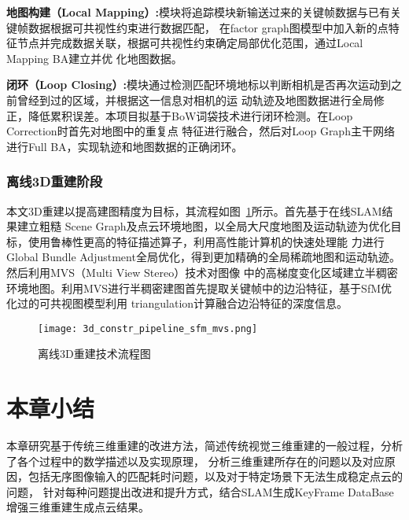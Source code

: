 \textbf{地图构建（Local Mapping）:}模块将追踪模块新输送过来的关键帧数据与已有关键帧数据根据可共视性约束进行数据匹配，
在factor graph图模型中加入新的点特征节点并完成数据关联，根据可共视性约束确定局部优化范围，通过Local Mapping BA建立并优
化地图数据。

\textbf{闭环（Loop Closing）:}模块通过检测匹配环境地标以判断相机是否再次运动到之前曾经到过的区域，并根据这一信息对相机的运
动轨迹及地图数据进行全局修正，降低累积误差。本项目拟基于BoW词袋技术进行闭环检测。在Loop Correction时首先对地图中的重复点
特征进行融合，然后对Loop Graph主干网络进行Full BA，实现轨迹和地图数据的正确闭环。
\subsubsection{离线3D重建阶段}
\label{sec:3.3.3.2}
本文3D重建以提高建图精度为目标，其流程如图~\ref{fig:3d_constr_pipeline_sfm_mvs}所示。首先基于在线SLAM结果建立粗糙
Scene Graph及点云环境地图，以全局大尺度地图及运动轨迹为优化目标，使用鲁棒性更高的特征描述算子，利用高性能计算机的快速处理能
力进行Global Bundle Adjustment全局优化，得到更加精确的全局稀疏地图和运动轨迹。然后利用MVS（Multi View Stereo）技术对图像
中的高梯度变化区域建立半稠密环境地图。利用MVS进行半稠密建图首先提取关键帧中的边沿特征，基于SfM优化过的可共视图模型利用
triangulation计算融合边沿特征的深度信息。 
\begin{figure}[H] %
  \centering
  \texttt{[image: 3d\_constr\_pipeline\_sfm\_mvs.png]}
  \caption{离线3D重建技术流程图}
  \label{fig:3d_constr_pipeline_sfm_mvs}
\end{figure}
\section{本章小结}
\label{sec:3.4}
本章研究基于传统三维重建的改进方法，简述传统视觉三维重建的一般过程，分析了各个过程中的数学描述以及实现原理，
分析三维重建所存在的问题以及对应原因，包括无序图像输入的匹配耗时问题，以及对于特定场景下无法生成稳定点云的问题，
针对每种问题提出改进和提升方式，结合SLAM生成KeyFrame DataBase增强三维重建生成点云结果。